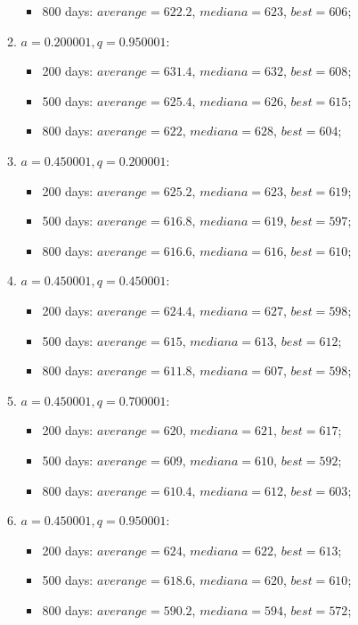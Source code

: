 \begin{enumerate}
\begin{enumerate}
\begin{itemize}
			\item 800 days: $averange = 622.2$, $mediana = 623$, $best = 606$;
		\end{itemize}
		\item $a= 0.200001, q= 0.950001$:
		\begin{itemize}
			\item 200 days: $averange = 631.4$, $mediana = 632$, $best = 608$;
			\item 500 days: $averange = 625.4$, $mediana = 626$, $best = 615$;
			\item 800 days: $averange = 622$, $mediana = 628$, $best = 604$;
		\end{itemize}
		\item $a= 0.450001, q= 0.200001$:
		\begin{itemize}
			\item 200 days: $averange = 625.2$, $mediana = 623$, $best = 619$;
			\item 500 days: $averange = 616.8$, $mediana = 619$, $best = 597$;
			\item 800 days: $averange = 616.6$, $mediana = 616$, $best = 610$;
		\end{itemize}
		\item $a= 0.450001, q= 0.450001$:
		\begin{itemize}
			\item 200 days: $averange = 624.4$, $mediana = 627$, $best = 598$;
			\item 500 days: $averange = 615$, $mediana = 613$, $best = 612$;
			\item 800 days: $averange = 611.8$, $mediana = 607$, $best = 598$;
		\end{itemize}
		\item $a= 0.450001, q= 0.700001$:
		\begin{itemize}
			\item 200 days: $averange = 620$, $mediana = 621$, $best = 617$;
			\item 500 days: $averange = 609$, $mediana = 610$, $best = 592$;
			\item 800 days: $averange = 610.4$, $mediana = 612$, $best = 603$;
		\end{itemize}
		\item $a= 0.450001, q= 0.950001$:
		\begin{itemize}
			\item 200 days: $averange = 624$, $mediana = 622$, $best = 613$;
			\item 500 days: $averange = 618.6$, $mediana = 620$, $best = 610$;
			\item 800 days: $averange = 590.2$, $mediana = 594$, $best = 572$;

\end{itemize}
\end{enumerate}
\end{enumerate}
